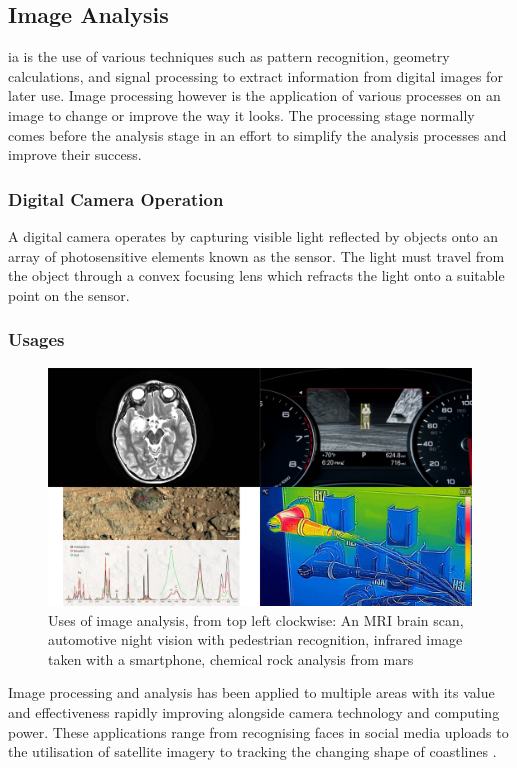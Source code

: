 \subsection{Image Analysis}
	\gls{ia} is the use of various techniques such as pattern recognition, 
	geometry calculations, and signal processing to extract information from 
	digital images for later use. Image processing however is the application 
	of various processes on an image to change or improve the way it looks. The 
	processing stage normally comes before the analysis stage in an effort to 
	simplify the analysis processes and improve their success.
	\subsubsection{Digital Camera Operation}
	A digital camera operates by capturing visible light reflected by objects 
	onto an array of photosensitive elements known as the sensor. The light 
	must travel from the object through a convex focusing lens which refracts 
	the light onto a suitable point on the sensor.
	\subsubsection{Usages}
		\begin{figure}[h!]
			\centering
			\includegraphics[width=15cm]{../images/4panel.png}
			\caption{Uses of image analysis, from top left clockwise: An MRI 
			brain scan, automotive night vision with pedestrian recognition, 
			infrared image taken with a smartphone, chemical rock analysis from 
			mars}
			\label{fig:curiosity}
		\end{figure}
	Image processing and analysis has been applied to multiple areas with its value and effectiveness rapidly improving alongside camera technology and computing power. These applications range from recognising faces in social media uploads \citep{zuckerberg2011tagging} to the utilisation of satellite imagery to tracking the changing shape of coastlines \citep{costalimagery}.
